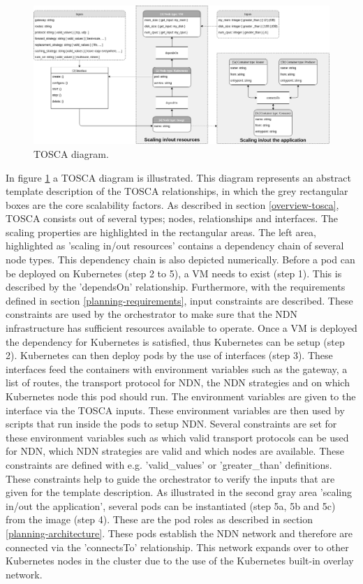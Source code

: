 \begin{figure}[H]
\centering
\includegraphics[width=\columnwidth]{Images/tosca-diagram.png}
\caption{TOSCA diagram.}
\label{fig:tosca-diagram}
\end{figure}

In figure \ref{fig:tosca-diagram} a TOSCA diagram is illustrated. This diagram represents an abstract template description of the TOSCA relationships, in which the grey rectangular boxes are the core scalability factors. As described in section \ref{overview-tosca}, TOSCA consists out of several types; nodes, relationships and interfaces. The scaling properties are highlighted in the rectangular areas. The left area, highlighted as 'scaling in/out resources' contains a dependency chain of several node types. This dependency chain is also depicted numerically. Before a pod can be deployed on Kubernetes (step 2 to 5), a VM needs to exist (step 1). This is described by the 'dependsOn' relationship. Furthermore, with the requirements defined in section \ref{planning-requirements}, input constraints are described. These constraints are used by the orchestrator to make sure that the NDN infrastructure has sufficient resources available to operate. Once a VM is deployed the dependency for Kubernetes is satisfied, thus Kubernetes can be setup (step 2). Kubernetes can then deploy pods by the use of interfaces (step 3). These interfaces feed the containers with environment variables such as the gateway, a list of routes, the transport protocol for NDN, the NDN strategies and on which Kubernetes node this pod should run. The environment variables are given to the interface via the TOSCA inputs. These environment variables are then used by scripts that run inside the pods to setup NDN. Several constraints are set for these environment variables such as which valid transport protocols can be used for NDN, which NDN strategies are valid and which nodes are available. These constraints are defined with e.g. 'valid\_values' or 'greater\_than' definitions. These constraints help to guide the orchestrator to verify the inputs that are given for the template description. As illustrated in the second gray area 'scaling in/out the application', several pods can be instantiated (step 5a, 5b and 5c) from the image (step 4). These are the pod roles as described in section \ref{planning-architecture}. These pods establish the NDN network and therefore are connected via the 'connectsTo' relationship. This network expands over to other Kubernetes nodes in the cluster due to the use of the Kubernetes built-in overlay network. 

